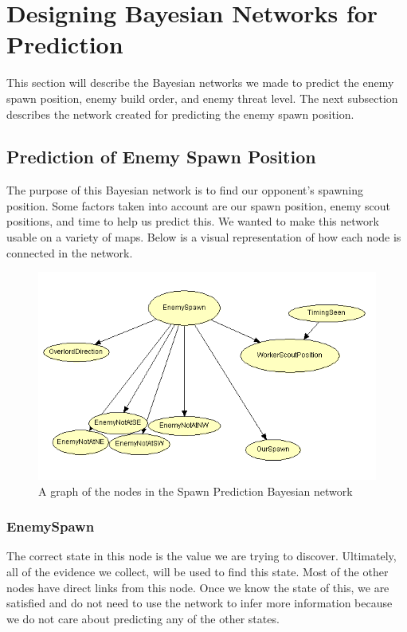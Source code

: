 \section{Designing Bayesian Networks for Prediction}\label{bayesian_network}
This section will describe the Bayesian networks we made to predict the enemy spawn position, enemy build order, and enemy threat level. The next subsection describes the network created for predicting the enemy spawn position.

\subsection{Prediction of Enemy Spawn Position}			 
			
The purpose of this Bayesian network is to find our opponent's spawning position. Some factors taken into account are our spawn position, enemy scout positions, and time to help us predict this. We wanted to make this network usable on a variety of maps. Below is a visual representation of how each node is connected in the network.

\begin{figure}[H]
	\includegraphics{Figures/BayesianPictures/SpawnPrediction.png}
	\caption{A graph of the nodes in the Spawn Prediction Bayesian network}
	\label{fig:predicting}
\end{figure}

\subsubsection*{EnemySpawn}
The correct state in this node is the value we are trying to discover. Ultimately, all of the evidence we collect, will be used to find this state. Most of the other nodes have direct links from this node. Once we know the state of this, we are satisfied and do not need to use the network to infer more information because we do not care about predicting any of the other states.


